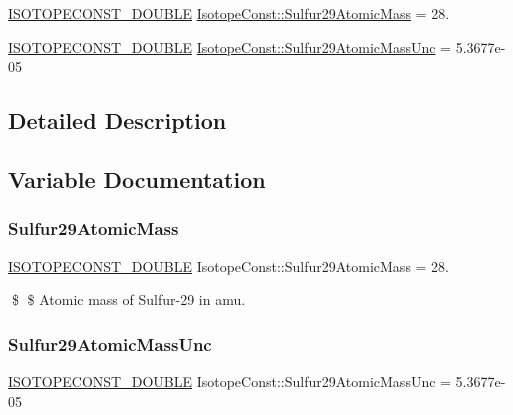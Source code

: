 \begin{DoxyCompactItemize}
\item 
\mbox{\hyperlink{group___isotope_const-_macros_ga8f45a7272ce02c0b4c65c44636ed719a}{I\+S\+O\+T\+O\+P\+E\+C\+O\+N\+S\+T\+\_\+\+D\+O\+U\+B\+LE}} \mbox{\hyperlink{group___isotope_const-_sulfur-_s29_ga153239fe405b6123c625498e4727a0e5}{Isotope\+Const\+::\+Sulfur29\+Atomic\+Mass}} = 28.
\item 
\mbox{\hyperlink{group___isotope_const-_macros_ga8f45a7272ce02c0b4c65c44636ed719a}{I\+S\+O\+T\+O\+P\+E\+C\+O\+N\+S\+T\+\_\+\+D\+O\+U\+B\+LE}} \mbox{\hyperlink{group___isotope_const-_sulfur-_s29_ga9f2115722b766deb3cbaab946329ff50}{Isotope\+Const\+::\+Sulfur29\+Atomic\+Mass\+Unc}} = 5.\+3677e-\/05
\end{DoxyCompactItemize}


\subsection{Detailed Description}


\subsection{Variable Documentation}
\mbox{\label{group___isotope_const-_sulfur-_s29_ga153239fe405b6123c625498e4727a0e5}} 
\subsubsection{\texorpdfstring{Sulfur29\+Atomic\+Mass}{Sulfur29AtomicMass}}
{\footnotesize\ttfamily \mbox{\hyperlink{group___isotope_const-_macros_ga8f45a7272ce02c0b4c65c44636ed719a}{I\+S\+O\+T\+O\+P\+E\+C\+O\+N\+S\+T\+\_\+\+D\+O\+U\+B\+LE}} Isotope\+Const\+::\+Sulfur29\+Atomic\+Mass = 28.}

\$ \$ Atomic mass of Sulfur-\/29 in amu. \mbox{\label{group___isotope_const-_sulfur-_s29_ga9f2115722b766deb3cbaab946329ff50}} 
\subsubsection{\texorpdfstring{Sulfur29\+Atomic\+Mass\+Unc}{Sulfur29AtomicMassUnc}}
{\footnotesize\ttfamily \mbox{\hyperlink{group___isotope_const-_macros_ga8f45a7272ce02c0b4c65c44636ed719a}{I\+S\+O\+T\+O\+P\+E\+C\+O\+N\+S\+T\+\_\+\+D\+O\+U\+B\+LE}} Isotope\+Const\+::\+Sulfur29\+Atomic\+Mass\+Unc = 5.\+3677e-\/05}


